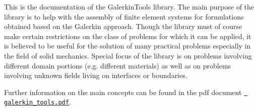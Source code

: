 This is the documentation of the Galerkin\+Tools library. The main purpose of the library is to help with the assembly of finite element systems for formulations obtained based on the Galerkin approach. Though the library must of course make certain restrictions on the class of problems for which it can be applied, it is believed to be useful for the solution of many practical problems especially in the field of solid mechanics. Special focus of the library is on problems involving different domain portions (e.\+g. different materials) as well as on problems involving unknown fields living on interfaces or boundaries.

Further information on the main concepts can be found in the pdf document \href{../notes/galerkin_tools.pdf}{\texttt{ galerkin\+\_\+tools.\+pdf}}. 
